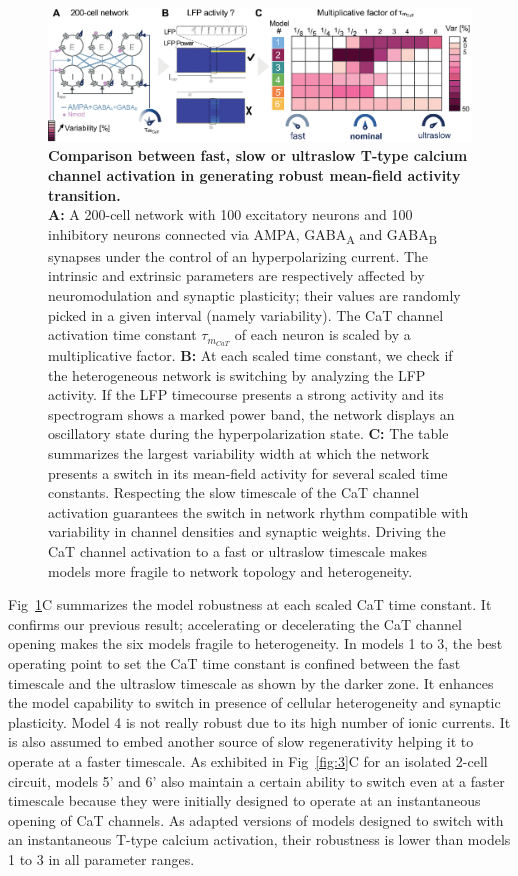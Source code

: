 \begin{figure}[h!]
\centering
\includegraphics[scale=0.95]{fig/Plos/Fig5}
\caption{ {\bf Comparison between fast, slow or ultraslow T-type calcium channel activation in generating robust mean-field activity transition. } \\
\textbf{A:} A 200-cell network with 100 excitatory neurons and 100 inhibitory neurons connected via AMPA,  GABA\textsubscript{A} and GABA\textsubscript{B} synapses under the control of an hyperpolarizing current.  The intrinsic and extrinsic parameters are respectively affected by neuromodulation and synaptic plasticity; their values are randomly picked in a given interval (namely variability). The CaT channel activation time constant $\tau_{m_{CaT}}$ of each neuron is scaled by a multiplicative factor. \textbf{B:} At each scaled time constant, we check if the heterogeneous network is switching by analyzing the LFP activity. If the LFP timecourse presents a strong activity and its spectrogram shows a marked power band, the network displays an oscillatory state during the hyperpolarization state.  \textbf{C:} The table summarizes the largest variability width at which the network presents a switch in its mean-field activity for several scaled time constants. Respecting the slow timescale of the CaT channel activation guarantees the switch in network rhythm compatible with variability in channel densities and synaptic weights. Driving the CaT channel activation to a fast or ultraslow timescale makes models more fragile to network topology and heterogeneity. }
\label{fig:5}
\end{figure}

Fig~\ref{fig:5}C summarizes the model robustness at each scaled CaT time constant. It confirms our previous result; accelerating or decelerating the CaT channel opening makes the six models fragile to heterogeneity. In models 1 to 3, the best operating point to set the CaT time constant is confined between the fast timescale and the ultraslow timescale as shown by the darker zone. It enhances the model capability to switch in presence of cellular heterogeneity and synaptic plasticity. Model 4 is not really robust due to its high number of ionic currents. It is also assumed to embed another source of slow regenerativity helping it to operate at a faster timescale.  As exhibited in Fig~\ref{fig:3}C for an isolated 2-cell circuit, models 5' and 6' also maintain a certain ability to switch even at a faster timescale because they were initially designed to operate at an instantaneous opening of CaT channels. As adapted versions of models designed to switch with an instantaneous T-type calcium activation, their robustness is lower than models 1 to 3 in all parameter ranges. 

